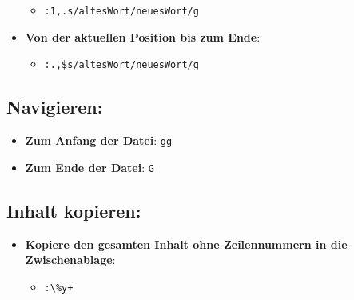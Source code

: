 \documentclass{vorlage-design-main}
\begin{document}
\begin{itemize}
  \begin{itemize}
  
  \item
    \verb|:1,.s/altesWort/neuesWort/g|
  \end{itemize}
\item
  \textbf{Von der aktuellen Position bis zum Ende}:

  \begin{itemize}
  
  \item
    \verb|:.,$s/altesWort/neuesWort/g|
  \end{itemize}
\end{itemize}

\hypertarget{navigieren}{%
\subsection{Navigieren:}\label{navigieren}}

\begin{itemize}

\item
  \textbf{Zum Anfang der Datei}: \verb|gg|
\item
  \textbf{Zum Ende der Datei}: \verb|G|
\end{itemize}

\hypertarget{inhalt-kopieren}{%
\subsection{Inhalt kopieren:}\label{inhalt-kopieren}}

\begin{itemize}

\item
  \textbf{Kopiere den gesamten Inhalt ohne Zeilennummern in die
  Zwischenablage}:

  \begin{itemize}
  
  \item
    \verb|:\%y+|
  \end{itemize}
\end{itemize} %


\clearpage
\printbibliography
\end{document}
